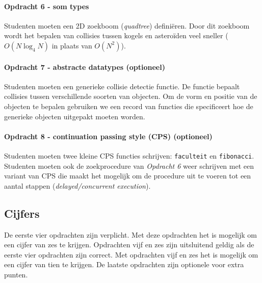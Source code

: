 		\paragraph{Opdracht 6 - som types}
			Studenten moeten een 2D zoekboom (\textit{quadtree}) definiëren. Door dit zoekboom wordt het bepalen van collisies tussen kogels en asteroïden veel sneller ($O(N \log_4 N)$ in plaats van $O(N^2)$).
			
		\paragraph{Opdracht 7 - abstracte datatypes (optioneel)}
			Studenten moeten een generieke collisie detectie functie. De functie bepaalt collisies tussen verschillende soorten van objecten. Om de vorm en positie van de objecten te bepalen gebruiken we een record van functies die specificeert hoe de generieke objecten uitgepakt moeten worden.
			
		\paragraph{Opdracht 8 - continuation passing style (CPS) (optioneel)}
			Studenten moeten twee kleine CPS functies schrijven: \texttt{faculteit} en \texttt{fibonacci}. Studenten moeten ook de zoekprocedure van \textit{Opdracht 6} weer schrijven met een variant van CPS die maakt het mogelijk om de procedure uit te voeren tot een aantal stappen (\textit{delayed/concurrent execution}).
			
	\subsection{Cijfers}
		De eerste vier opdrachten zijn verplicht. Met deze opdrachten het is mogelijk om een cijfer van zes te krijgen. Opdrachten vijf en zes zijn uitsluitend geldig als de eerste vier opdrachten zijn correct. Met opdrachten vijf en zes het is mogelijk om een cijfer van tien te krijgen. De laatste opdrachten zijn optionele voor extra punten.
		
